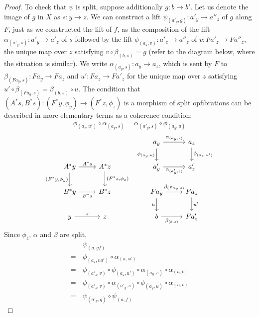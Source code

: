 \begin{proof}
  To check that $\psi$ is split,
  suppose additionally $g : b \to b'$.
  Let us denote the image of $g$ in $X$ as $s : y \to z$.
  We can construct a lift $\psi_{(a'_y,g)} : a'_y \to a''_z$
  of $g$ along $F$,
  just as we constructed the lift of $f$,
  as the composition of the lift $\alpha_{(a'_y,s)} : a'_y \to a'_z$
  of $s$ followed by the lift $\phi_{(a_z,v)} : a'_z \to a''_z$ of 
  $v : F a'_z \to F a''_z$, 
  the unique map over $z$ satisfying
  $v \circ \beta_{(b,s)} = g$
  (refer to the diagram below, where the situation is similar).
  We write $\alpha_{(a_y,s)} : a_y \to a_z$,
  which is sent by $F$ to $\beta_{(F a_y,s)} : F a_y \to F a_z$ and
  $u' : F a_z \to F a'_z$ for the unique map over $z$
  satisfying $u' \circ \beta_{(F a_y,s)} = \beta_{(b,s)} \circ u$.
  The condition that
  $(A^* s, B^* s) : (F^* y,\phi_y) \to (F^* z,\phi_z)$
  is a morphism of split opfibrations can be described in
  more elementary terms as a coherence condition:
  \[\phi_{(a_z,u')} \circ \alpha_{(a_y,s)} = \alpha_{(a'_y,s)} \circ \phi_{(a_y,u)}\]
  \[\begin{tikzcd}
    &&& {a_y} & {a_z} \\
    {A^* y} & {A^* z} && {a_y'} & {a'_z} \\
    {B^* y} & {B^* z} && {F a_y} & {F a_z} \\
    y & z && b & {F a'_z}
    \arrow["{{{{\alpha_{(a_y,s)}}}}}", from=1-4, to=1-5]
    \arrow["{{{{\phi_{(a_y,u)}}}}}"', from=1-4, to=2-4]
    \arrow["{{{{\phi_{(a_z,u')}}}}}", from=1-5, to=2-5]
    \arrow["{{A^*s}}", from=2-1, to=2-2]
    \arrow["{{(F^* y,\phi_y)}}"', from=2-1, to=3-1]
    \arrow["{{(F^* z,\phi_z)}}", from=2-2, to=3-2]
    \arrow["{{{{\alpha_{(a'_y,s)}}}}}"', from=2-4, to=2-5]
    \arrow["{{B^*s}}"', from=3-1, to=3-2]
    \arrow["{{{{\beta_{(F a_y, s)}}}}}", from=3-4, to=3-5]
    \arrow["u"', from=3-4, to=4-4]
    \arrow["{{{u'}}}", from=3-5, to=4-5]
    \arrow["s", from=4-1, to=4-2]
    \arrow["{{{{\beta_{(b, s)}}}}}"', from=4-4, to=4-5]
  \end{tikzcd}\]
  Since $\phi_z$, $\alpha$ and $\beta$ are split,
  \begin{align*}
    & \psi_{(a, gf)} \\
  = \, & \phi_{(a_z,v u')} \circ \alpha_{(a,st)}\\
  = \, & \phi_{(a'_z,v)} \circ \phi_{(a_z,u')} \circ \alpha_{(a_y,s)} \circ \alpha_{(a,t)} \\
  = \, & \phi_{(a'_z,v)} \circ \alpha_{(a'_y,s)} \circ \phi_{(a_y,u)} \circ \alpha_{(a,t)} \\
  = \, & \psi_{(a'_y,g)} \circ \psi_{(a,f)}
  \end{align*}
  

\end{proof}
